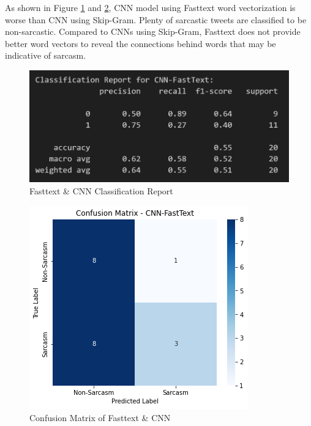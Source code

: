 \documentclass[11pt]{article}
\begin{document}
As shown in Figure \ref{fig:ftcnncr} and \ref{fig:ftcnncm}, CNN model using Fasttext word vectorization is worse than CNN using Skip-Gram. Plenty of sarcastic tweets are classified to be non-sarcastic. Compared to CNNs using Skip-Gram, Fasttext does not provide better word vectors to reveal the connections behind words that may be indicative of sarcasm.
\begin{figure}[htbp]
    \centering
    \includegraphics[width=.8\linewidth]{pic/CNN-fasttext-Report.png}
    \caption{Fasttext \& CNN Classification Report}
    \label{fig:ftcnncr}
\end{figure}
\begin{figure}[htbp]
    \centering
    \includegraphics[width=.8\linewidth]{pic/CNN-fasttext-Matrix.png}
    \caption{Confusion Matrix of Fasttext \& CNN}
    \label{fig:ftcnncm}
\end{figure}
\end{document}
